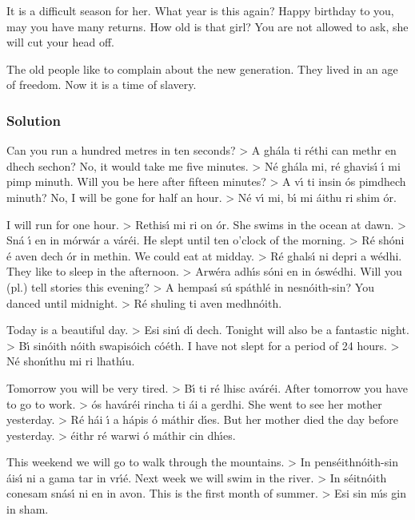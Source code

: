 It is a difficult season for her.
What year is this again?
Happy birthday to you, may you have many returns.
How old is that girl?
You are not allowed to ask, she will cut your head off.

The old people like to complain about the new generation.
They lived in an age of freedom.
Now it is a time of slavery.

\newpage
\subsubsection{Solution}

Can you run a hundred metres in ten seconds? > A gh\'{a}la ti r\'{e}thi can methr en dhech sechon?
No, it would take me five minutes. > N\'{e} gh\'{a}la mi, r\'{e} ghavis\'{\i} \'{\i} mi pimp minuth.
Will you be here after fifteen minutes? > A v\'{\i} ti insin \'{o}s pimdhech minuth?
No, I will be gone for half an hour. > N\'{e} v\'{\i} mi, b\'{\i} mi \'{a}ithu ri shim \'{o}r.

I will run for one hour. > Rethis\'{\i} mi ri on \'{o}r.
She swims in the ocean at dawn. > Sn\'{a} \'{\i} en in m\'{o}rw\'{a}r a v\'{a}r\'{e}i.
He slept until ten o’clock of the morning. > R\'{e} sh\'{o}ni \'{e} aven dech \'{o}r in methin.
We could eat at midday. > R\'{e} ghals\'{\i} ni depri a w\'{e}dhi.
They like to sleep in the afternoon. > Arw\'{e}ra adh\'{\i}s s\'{o}ni en in \'{o}sw\'{e}dhi.
Will you (pl.) tell stories this evening? > A hempas\'{\i} s\'{u} sp\'{a}thl\'{e} in nesn\'{o}ith-sin?
You danced until midnight. > R\'{e} shuling ti aven medhn\'{o}ith.

Today is a beautiful day. > Esi sin\'{\i} d\'{\i} dech.
Tonight will also be a fantastic night. > B\'{\i} sin\'{o}ith n\'{o}ith swapis\'{o}ich c\'{o}\'{e}th.
I have not slept for a period of 24 hours. > N\'{e} shon\'{\i}thu mi ri lhath\'{\i}u.

Tomorrow you will be very tired. > B\'{\i} ti r\'{e} lhisc av\'{a}r\'{e}i.
After tomorrow you have to go to work. > \'{o}s hav\'{a}r\'{e}i rincha ti \'{a}i a gerdhi.
She went to see her mother yesterday. > R\'{e} h\'{a}i \'{\i} a h\'{a}pis \'{o} m\'{a}thir d\'{\i}es.
But her mother died the day before yesterday. > \'{e}ithr r\'{e} warwi \'{o} m\'{a}thir cin dh\'{\i}es.

This weekend we will go to walk through the mountains. > In pens\'{e}ithn\'{o}ith-sin \'{a}is\'{\i} ni a gama 
                                                                                               tar in vr\'{\i}\'{e}.
Next week we will swim in the river. > In s\'{e}itn\'{o}ith conesam sn\'{a}s\'{\i} ni en in avon.
This is the first month of summer. > Esi sin m\'{\i}s gin in sham.

